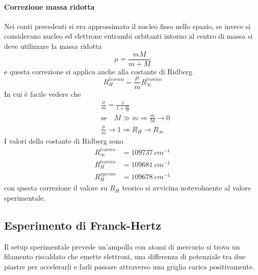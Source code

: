 \paragraph{Correzione massa ridotta} Nei conti precedenti si era approssimato il nucleo fisso nello spazio, se invece si considerano nucleo ed elettrone entrambi orbitanti intorno al centro di massa si deve utilizzare la massa ridotta
\begin{equation}
\mu = \frac{ m M}{m + M }
\end{equation}
e questa correzione si applica anche alla costante di Ridberg
\begin{equation}
R_H^{teorico} = \frac{ \mu}{ m} R_{\infty}^{teorico}
\end{equation}
In cui è facile vedere che 
\begin{equation}
\begin{split}
& \frac{ \mu}{m } = \frac{ 1}{1 + \frac{ m}{M } } \\
& \mbox{se}\quad M \gg m  \Rightarrow \frac{ m}{M } \to 0 \\
& \frac{ \mu}{m }\to 1 \Rightarrow R_H \to R_{\infty}
\end{split}
\end{equation}
I valori della costante di Ridberg sono
\begin{equation}
\begin{split}
R_{\infty}^{teorico} & = \SI{109737}{cm^{-1}} \\
R_{H}^{teorico} & = \SI{109681}{cm^{-1}} \\
R_{H}^{sperim} & = \SI{109678}{cm^{-1}}
\end{split}
\end{equation}
con questa correzione il valore su $R_H$ teorico si avvicina notevolmente al valore sperimentale.


\subsection{Esperimento di Franck-Hertz}
Il setup sperimentale prevede un'ampolla con atomi di mercurio si trova un filamento riscaldato che emette elettroni, una differenza di potenziale tra due piastre per accelerarli e farli passare attraverso una griglia carica positivamente.
